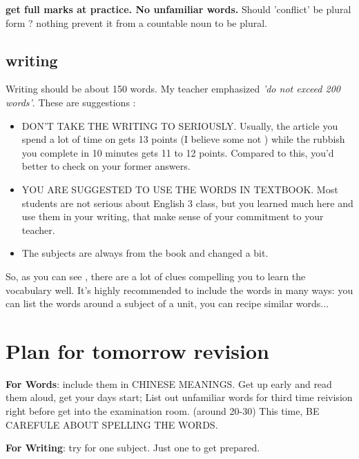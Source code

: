 \documentclass[10pt]{article}
\begin{document}
\textbf{get full marks at practice. No unfamiliar words.} Should 'conflict' be plural form ? nothing prevent it from a countable noun to be plural.

\subsection{writing}
Writing should be about 150 words. My teacher emphasized \emph{'do not exceed 200 words'}. These are suggestions :
\begin{itemize}
    \item DON'T TAKE THE WRITING TO SERIOUSLY. Usually, the article you spend a lot of time on gets 13 points (I believe some not ) while the rubbish you complete in 10 minutes gets 11 to 12 points. Compared to this, you'd better to check on your former answers. 
    \item YOU ARE SUGGESTED TO USE THE WORDS IN TEXTBOOK. Most students are not serious about English 3 class, but you learned much here and use them in your writing, that make sense of your commitment to your teacher.
    \item The subjects are always from the book and changed a bit. 
\end{itemize}
So, as you can see , there are a lot of clues compelling you to learn the vocabulary well. It's highly recommended to include the words in many ways: you can list the words around a subject of a unit, you can recipe similar words...

\section{Plan for tomorrow revision}
\textbf{For Words}: include them in CHINESE MEANINGS. Get up early and read them aloud, get your days start; List out unfamiliar words for third time reivision right before get into the examination room. (around 20-30)
This time, BE CAREFULE ABOUT SPELLING THE WORDS.\par
\textbf{For Writing}: try for one subject. Just one to get prepared.




 
 
 
\end{document}
